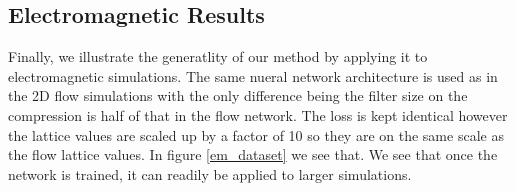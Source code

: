 \documentclass{article}
\begin{document}
\subsection{Electromagnetic Results}

Finally, we illustrate the generatlity of our method by applying it to electromagnetic simulations. The same nueral network architecture is used as in the 2D flow simulations with the only difference being the filter size on the compression is half of that in the flow network. The loss is kept identical however the lattice values are scaled up by a factor of 10 so they are on the same scale as the flow lattice values. In figure \ref{em_dataset} we see that. We see that once the network is trained, it can readily be applied to larger simulations.

\begin{figure}[!t]
\centering
{}

\end{figure}
\end{document}
